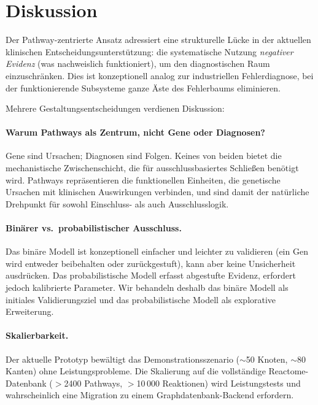 \documentclass[12pt,a4paper]{article}
\begin{document}
\section{Diskussion}
\label{sec:discussion}

Der Pathway-zentrierte Ansatz adressiert eine strukturelle Lücke in der aktuellen klinischen Entscheidungsunterstützung: die systematische Nutzung \emph{negativer Evidenz} (was nachweislich funktioniert), um den diagnostischen Raum einzuschränken. Dies ist konzeptionell analog zur industriellen Fehlerdiagnose, bei der funktionierende Subsysteme ganze Äste des Fehlerbaums eliminieren.

Mehrere Gestaltungsentscheidungen verdienen Diskussion:

\paragraph{Warum Pathways als Zentrum, nicht Gene oder Diagnosen?} Gene sind Ursachen; Diagnosen sind Folgen. Keines von beiden bietet die mechanistische Zwischenschicht, die für ausschlussbasiertes Schließen benötigt wird. Pathways repräsentieren die funktionellen Einheiten, die genetische Ursachen mit klinischen Auswirkungen verbinden, und sind damit der natürliche Drehpunkt für sowohl Einschluss- als auch Ausschlusslogik.

\paragraph{Binärer vs.\ probabilistischer Ausschluss.} Das binäre Modell ist konzeptionell einfacher und leichter zu validieren (ein Gen wird entweder beibehalten oder zurückgestuft), kann aber keine Unsicherheit ausdrücken. Das probabilistische Modell erfasst abgestufte Evidenz, erfordert jedoch kalibrierte Parameter. Wir behandeln deshalb das binäre Modell als initiales Validierungsziel und das probabilistische Modell als explorative Erweiterung.

\paragraph{Skalierbarkeit.} Der aktuelle Prototyp bewältigt das Demonstrationsszenario ($\sim$50 Knoten, $\sim$80 Kanten) ohne Leistungsprobleme. Die Skalierung auf die vollständige Reactome-Datenbank ($>$2400 Pathways, $>$10\,000 Reaktionen) wird Leistungstests und wahrscheinlich eine Migration zu einem Graphdatenbank-Backend erfordern.
\end{document}
